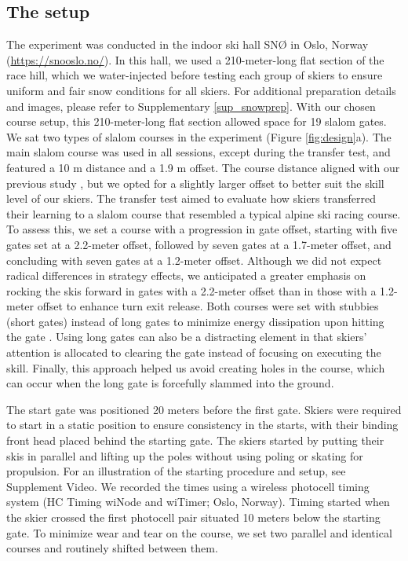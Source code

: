 \documentclass[pdflatex,sn-mathphys-num]{sn-jnl}%
\theoremstyle{thmstyleone}%
\theoremstyle{thmstyletwo}%
\theoremstyle{thmstylethree}%
\begin{document}
\subsection{The setup}
The experiment was conducted in the indoor ski hall SNØ in Oslo, Norway (\url{https://snooslo.no/}). In this hall, we used a 210-meter-long flat section of the race hill, which we water-injected before testing each group of skiers to ensure uniform and fair snow conditions for all skiers. For additional preparation details and images, please refer to Supplementary \ref{sup_snowprep}. With our chosen course setup, this 210-meter-long flat section allowed space for 19 slalom gates. We sat two types of slalom courses in the experiment (Figure \ref{fig:design}a). The main slalom course was used in all sessions, except during the transfer test, and featured a 10 m distance and a 1.9 m offset. The course distance aligned with our previous study \cite{magelssen_is_2022}, but we opted for a slightly larger offset to better suit the skill level of our skiers. The transfer test aimed to evaluate how skiers transferred their learning to a slalom course that resembled a typical alpine ski racing course. To assess this, we set a course with a progression in gate offset, starting with five gates set at a 2.2-meter offset, followed by seven gates at a 1.7-meter offset, and concluding with seven gates at a 1.2-meter offset. Although we did not expect radical differences in strategy effects, we anticipated a greater emphasis on rocking the skis forward in gates with a 2.2-meter offset than in those with a 1.2-meter offset to enhance turn exit release. Both courses were set with stubbies (short gates) instead of long gates to minimize energy dissipation upon hitting the gate \cite{minetti_biomechanics_2018}. Using long gates can also be a distracting element in that skiers' attention is allocated to clearing the gate instead of focusing on executing the skill. Finally, this approach helped us avoid creating holes in the course, which can occur when the long gate is forcefully slammed into the ground.

The start gate was positioned 20 meters before the first gate. Skiers were required to start in a static position to ensure consistency in the starts, with their binding front head placed behind the starting gate. The skiers started by putting their skis in parallel and lifting up the poles without using poling or skating for propulsion. For an illustration of the starting procedure and setup, see Supplement Video. We recorded the times using a wireless photocell timing system (HC Timing wiNode and wiTimer; Oslo, Norway). Timing started when the skier crossed the first photocell pair situated 10 meters below the starting gate. To minimize wear and tear on the course, we set two parallel and identical courses and routinely shifted between them.
 
\end{document}
